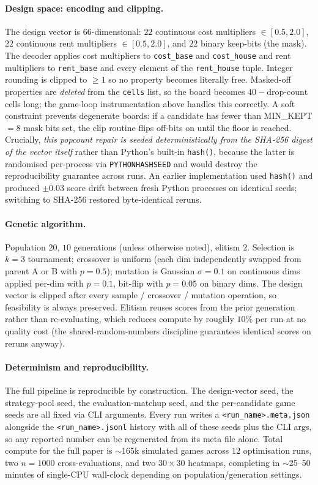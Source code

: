 \documentclass[10pt]{article}
\begin{document}
\paragraph{Design space: encoding and clipping.} The design vector is
$66$-dimensional: $22$ continuous cost multipliers $\in[0.5,2.0]$, $22$
continuous rent multipliers $\in[0.5,2.0]$, and $22$ binary keep-bits
(the mask). The decoder applies cost multipliers to \texttt{cost\_base}
and \texttt{cost\_house} and rent multipliers to \texttt{rent\_base}
and every element of the \texttt{rent\_house} tuple. Integer rounding
is clipped to $\geq 1$ so no property becomes literally free. Masked-off
properties are \emph{deleted} from the \texttt{cells} list, so the board
becomes $40 - \text{drop-count}$ cells long; the game-loop instrumentation
above handles this correctly. A soft constraint prevents degenerate
boards: if a candidate has fewer than MIN\_KEPT$=8$ mask bits set, the
clip routine flips off-bits on until the floor is reached. Crucially,
\emph{this popcount repair is seeded deterministically from the SHA-256
digest of the vector itself} rather than Python's built-in
\texttt{hash()}, because the latter is randomised per-process via
\texttt{PYTHONHASHSEED} and would destroy the reproducibility guarantee
across runs. An earlier implementation used \texttt{hash()} and produced
$\pm 0.03$ score drift between fresh Python processes on identical
seeds; switching to SHA-256 restored byte-identical reruns.

\paragraph{Genetic algorithm.} Population $20$, $10$ generations (unless
otherwise noted), elitism $2$. Selection is $k{=}3$ tournament; crossover
is uniform (each dim independently swapped from parent A or B with
$p=0.5$); mutation is Gaussian $\sigma{=}0.1$ on continuous dims applied
per-dim with $p=0.1$, bit-flip with $p=0.05$ on binary dims. The design
vector is clipped after every sample / crossover / mutation operation,
so feasibility is always preserved. Elitism reuses scores from the prior
generation rather than re-evaluating, which reduces compute by roughly
$10\%$ per run at no quality cost (the shared-random-numbers discipline
guarantees identical scores on reruns anyway).

\paragraph{Determinism and reproducibility.} The full pipeline is
reproducible by construction. The design-vector seed, the strategy-pool
seed, the evaluation-matchup seed, and the per-candidate game seeds are
all fixed via CLI arguments. Every run writes a
\texttt{<run\_name>.meta.json} alongside the \texttt{<run\_name>.jsonl}
history with all of these seeds plus the CLI args, so any reported
number can be regenerated from its meta file alone. Total compute for
the full paper is $\sim$165k simulated games across $12$ optimisation
runs, two $n{=}1000$ cross-evaluations, and two $30\times30$ heatmaps,
completing in $\sim$25--50 minutes of single-CPU wall-clock depending on
population/generation settings.
\end{document}
